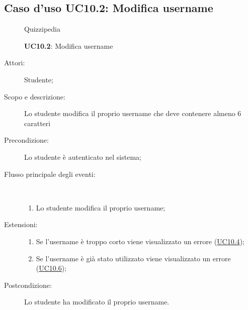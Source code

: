 \subsection{Caso d'uso UC10.2: Modifica username}
\begin{figure}[H]
	\centering
	\begin{resizedtikzpicture}{\textwidth}
		\begin{umlsystem}[x=0, fill=lightgray!20]{Quizzipedia}
		\end{umlsystem}
	\end{resizedtikzpicture}
	\caption{\textbf{UC10.2}: Modifica username}
	\label{UC10.2}
\end{figure}
\begin{description}
	\item[Attori:] Studente;
	\item[Scopo e descrizione:] Lo studente modifica il proprio username che deve contenere almeno 6 caratteri
	\item[Precondizione:] Lo studente è autenticato nel sistema;
	
	\item[Flusso principale degli eventi:] \ 
	\begin{enumerate}
		\item Lo studente modifica il proprio username;
		
	\end{enumerate}
	\item[Estensioni:]
	\begin{enumerate}
		\item Se l'username è troppo corto viene visualizzato un errore (\hyperlink{UC10.4}{UC10.4});
		\item Se l'username è già stato utilizzato viene visualizzato un errore (\hyperlink{UC10.6}{UC10.6});
		
	\end{enumerate}
	\item[Postcondizione:] Lo studente ha modificato il proprio username.
\end{description}
\hypertarget{UC10.3}{}
